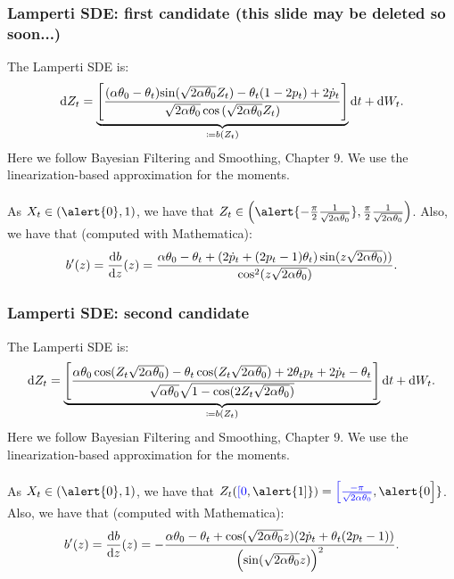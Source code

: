 \documentclass[aspectratio=169]{beamer}\usepackage[utf8]{inputenc}
\begin{document}

\begin{frame}\frametitle{Lamperti SDE: {\color{blue} first candidate} (this slide may be deleted so soon...)}

The Lamperti SDE is:
\begin{align*}
\dif Z_t= \underbrace{\left[  \frac{(\alpha \theta_0 - \theta_t) {\color{black}\sin(\sqrt{2 \alpha \theta_0 } Z_t) }- \theta_t (1 - 2 p_t) + 2  \dot{p}_t }{\sqrt{2 \alpha \theta_0} \cos{(\sqrt{2 \alpha \theta_0} Z_t)}}  \right]}_{\coloneqq b(Z_t)} \dif t + \dif W_t . 
\end{align*}
Here we follow Bayesian Filtering and Smoothing, Chapter 9. We use the linearization-based approximation for the moments.\\
\quad\\
As $X_t\in(\alert{0},1)$, we have that $Z_t\in\left(\alert{-\frac{\pi}{2}\frac{1}{\sqrt{2\alpha\theta_0}}},\frac{\pi}{2}\frac{1}{\sqrt{2\alpha\theta_0}}\right)$.
{
Also, we have that (computed with Mathematica):
\begin{equation*}
b'(z)=\frac{\dif b}{\dif z}(z)=\frac{\alpha\theta_0-\theta_t+(2\dot{p}_t+(2p_t-1)\theta_t)\sin(z\sqrt{2\alpha\theta_0}))}{\cos^2(z\sqrt{2\alpha\theta_0})}.
\end{equation*}}

\end{frame}


\begin{frame}\frametitle{Lamperti SDE: {\color{red} second candidate}}

The Lamperti SDE is:
\begin{align*}
\dif Z_t= \underbrace{\left[\frac{\alpha\theta_0\cos(Z_t\sqrt{2\alpha\theta_0})-\theta_t\cos(Z_t\sqrt{2\alpha\theta_0})+2\theta_tp_t+2\dot{p}_t-\theta_t}{\sqrt{\alpha\theta_0}\sqrt{1-\cos(2Z_t\sqrt{2\alpha\theta_0})}}\right]}_{\coloneqq b(Z_t)} \dif t + \dif W_t . 
\end{align*}
Here we follow Bayesian Filtering and Smoothing, Chapter 9. We use the linearization-based approximation for the moments.\\
\quad\\
As $X_t\in(\alert{0},1)$, we have that $Z_t({\color{blue}[0},\alert{1]})={\color{blue}\Big[\frac{-\pi}{\sqrt{2\alpha\theta_0}}},\alert{0\Big]}$.
{
Also, we have that (computed with Mathematica):
\begin{equation*}
b'(z)=\frac{\dif b}{\dif z}(z)=-\frac{\alpha\theta_0-\theta_t+\cos(\sqrt{2\alpha\theta_0}z)(2\dot{p}_t+\theta_t(2p_t-1))}{\left(\sin(\sqrt{2\alpha\theta_0}z)\right)^2}.
\end{equation*}}

\end{frame}
\end{document}

